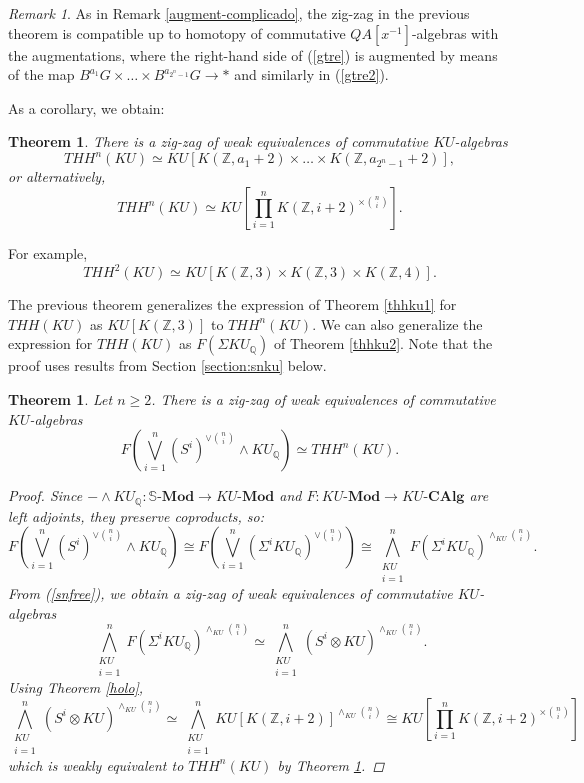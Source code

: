\documentclass[a4paper,11pt]{amsart} %
\theoremstyle{definition} \newtheorem{defn}[equation]{Definition}
\theoremstyle{remark} \newtheorem{notation}[equation]{Notation}
\theoremstyle{plain} \newtheorem{teo}[equation]{Theorem}
\theoremstyle{plain} \newtheorem{lema}[equation]{Lemma}
\theoremstyle{plain} \newtheorem{prop}[equation]{Proposition}
\theoremstyle{plain} \newtheorem{corolario}[equation]{Corollary}
\theoremstyle{remark} \newtheorem{obs}[equation]{Remark}
\theoremstyle{remark} \newtheorem{sideobs}[equation]{Side remark}
\theoremstyle{remark} \newtheorem{ejercicio}[equation]{Exercise}
\theoremstyle{definition} \newtheorem{notn}[equation]{Notation}
\theoremstyle{remark} \newtheorem{ej}[equation]{Example}
\theoremstyle{remark} \newtheorem{contraej}[equation]{Counterexample}
\theoremstyle{plain} \newtheorem{conj}[equation]{Conjecture}
\renewcommand{\1}{\ensuremath{\mathbbm{1}}}
\newcommand{\Q}{\mathbb{Q}}
\newcommand{\Z}{\mathbb{Z}}
\newcommand{\bprf}{\begin{proof}}
\newcommand{\eprf}{\end{proof}}
\newcommand{\bobs}{\begin{obs}}
\newcommand{\eobs}{\end{obs}}
\newcommand{\bteo}{\begin{teo}}
\newcommand{\eteo}{\end{teo}}
\newcommand{\Mod}{\mbox{-}\mathbf{Mod}}
\newcommand{\CAlg}{\mbox{-}\mathbf{CAlg}}
\newcommand{\SMod}{\ensuremath{\mathbb{S}}\mbox{-}\ensuremath{\textbf{Mod}}}
\numberwithin{equation}{section}
\begin{document}
\bobs \label{augment-complicado2} As in Remark \ref{augment-complicado}, the zig-zag in the previous theorem is compatible up to homotopy of commutative $QA[x^{-1}]$-algebras with the augmentations, where the right-hand side of (\ref{gtre}) is augmented by means of the map $B^{a_1}G\times \dots\times B^{a_{2^n-1}}G\to *$ and similarly in (\ref{gtre2}).
\eobs



As a corollary, we obtain:

\bteo \label{thhnku1cor}
There is a zig-zag of weak equivalences of commutative $KU$-algebras
\begin{equation}\label{thhnku1}THH^n(KU)\simeq KU[K(\Z,a_1+2) \times \dots \times K(\Z,a_{2^n-1}+2)],\end{equation}
or alternatively,
\begin{equation}\label{thhnku2}THH^n(KU)\simeq KU\left[\prod\limits_{i=1}^n K(\Z,i+2)^{\times {n \choose i}}\right].\end{equation}
\eteo
For example,
\begin{equation}\label{thh2kua} THH^2(KU)\simeq KU[K(\Z,3)\times K(\Z,3)\times K(\Z,4)].\end{equation}

%
%
%
%

The previous theorem generalizes the expression of Theorem \ref{thhku1} for $THH(KU)$ as \linebreak $KU[K(\Z,3)]$ to $THH^n(KU)$. We can also generalize the expression for $THH(KU)$ as $F(\Sigma KU_\Q)$ of Theorem \ref{thhku2}. Note that the proof uses results from Section \ref{section:snku} below.

\bteo \label{thhnkufree} Let $n\geq 2$. There is a zig-zag of weak equivalences of commutative $KU$-algebras
\[F\left(\bigvee\limits_{i=1}^n (S^i)^{\vee {n\choose i}} \wedge KU_\Q\right)
%
\simeq THH^n(KU).\]
\bprf Since $- \wedge KU_\Q:\SMod\to KU\Mod$ and $F:KU\Mod\to KU\CAlg$ are left adjoints, they preserve coproducts, so:
\[F\left(\bigvee\limits_{i=1}^n (S^i)^{\vee {n\choose i}} \wedge KU_\Q\right)
\cong F\left(\bigvee_{i=1}^n (\Sigma^i KU_\Q)^{\vee {n\choose i} } \right) \cong \bigwedge_{\substack{KU \\ i=1}}^n F(\Sigma^i KU_\Q)^{\wedge_{KU} {n\choose i}}.\]
From (\ref{snfree}), we obtain a zig-zag of weak equivalences of commutative $KU$-algebras %
\[\bigwedge_{\substack{KU \\ i=1}}^n F(\Sigma^i KU_\Q)^{\wedge_{KU} {n \choose i}} \simeq  \bigwedge_{\substack{KU \\ i=1}}^n (S^i\otimes KU)^{\wedge_{KU} {n \choose i}}. \] %
Using Theorem \ref{holo}, %
%
\[\bigwedge_{\substack{KU \\ i=1}}^n (S^i\otimes KU)^{\wedge_{KU} {n \choose i}} \simeq \bigwedge_{\substack{KU \\ i=1}}^n KU[K(\Z,i+2)]^{\wedge_{KU} {n \choose i}} \cong KU\left[ \prod_{i=1}^n K(\Z,i+2)^{\times {n\choose i}}\right]\]
which is weakly equivalent to $THH^n(KU)$ by Theorem \ref{thhnku1cor}.
\eprf
\eteo
\end{document}
